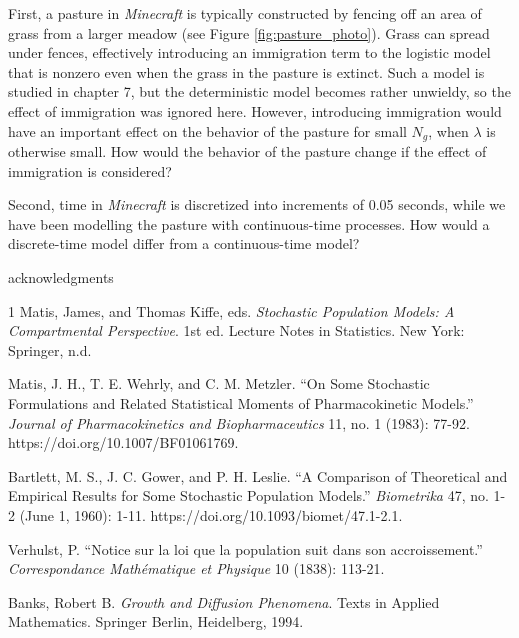 \documentclass{article}
\theoremstyle{theorem}
\theoremstyle{definition}
\begin{document}
First, a pasture in \textit{Minecraft} is typically constructed by fencing off an area of grass from a larger meadow (see Figure \ref{fig:pasture_photo}). Grass can spread under fences, effectively introducing an immigration term to the logistic model that is nonzero even when the grass in the pasture is extinct. Such a model is studied in \cite{matis_kiffe} chapter 7, but the deterministic model becomes rather unwieldy, so the effect of immigration was ignored here. However, introducing immigration would have an important effect on the behavior of the pasture for small $N_g$, when $\lambda$ is otherwise small. How would the behavior of the pasture change if the effect of immigration is considered? 

Second, time in \textit{Minecraft} is discretized into increments of 0.05 seconds, while we have been modelling the pasture with continuous-time processes. How would a discrete-time model differ from a continuous-time model?


\begin{acknowledgment}
acknowledgments
\end{acknowledgment}

\begin{abstract}
abstract
\end{abstract}

\begin{thebibliography}{1}
     Matis, James, and Thomas Kiffe, eds. \textit{Stochastic Population Models: A Compartmental Perspective}. 1st ed. Lecture Notes in Statistics. New York: Springer, n.d.

     Matis, J. H., T. E. Wehrly, and C. M. Metzler. “On Some Stochastic Formulations and Related Statistical Moments of Pharmacokinetic Models.” \textit{Journal of Pharmacokinetics and Biopharmaceutics} 11, no. 1 (1983): 77-92. https://doi.org/10.1007/BF01061769.

     Bartlett, M. S., J. C. Gower, and P. H. Leslie. “A Comparison of Theoretical and Empirical Results for Some Stochastic Population Models.” \textit{Biometrika} 47, no. 1-2 (June 1, 1960): 1-11. https://doi.org/10.1093/biomet/47.1-2.1.

     Verhulst, P. “Notice sur la loi que la population suit dans son accroissement.” \textit{Correspondance Mathématique et Physique} 10 (1838): 113-21.

     Banks, Robert B. \textit{Growth and Diffusion Phenomena}. Texts in Applied Mathematics. Springer Berlin, Heidelberg, 1994.

\end{thebibliography}
\end{document}

